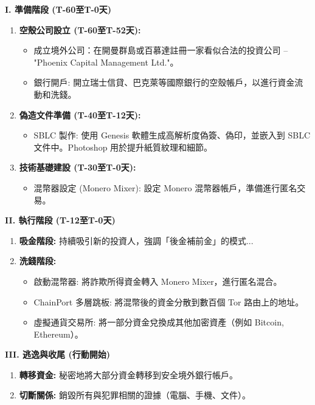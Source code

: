 \documentclass[conference]{IEEEtran}
\begin{document}
\textbf{I. 準備階段 (T-60至T-0天)}
\begin{enumerate}
    \item \textbf{空殼公司設立 (T-60至T-52天):}
    \begin{itemize}
        \item 成立境外公司：在開曼群島或百慕達註冊一家看似合法的投資公司 – "Phoenix Capital Management Ltd."。
        \item 銀行開戶: 開立瑞士信貸、巴克萊等國際銀行的空殼帳戶，以進行資金流動和洗錢。
    \end{itemize}
    \item \textbf{偽造文件準備 (T-40至T-12天):}
    \begin{itemize}
        \item SBLC 製作: 使用 Genesis 軟體生成高解析度偽簽、偽印，並嵌入到 SBLC 文件中。Photoshop 用於提升紙質紋理和細節。
    \end{itemize}
    \item \textbf{技術基礎建設 (T-30至T-0天):}
    \begin{itemize}
        \item 混幣器設定 (Monero Mixer): 設定 Monero 混幣器帳戶，準備進行匿名交易。
    \end{itemize}
\end{enumerate}

\textbf{II. 執行階段 (T-12至T-0天)}
\begin{enumerate}
    \item \textbf{吸金階段:} 持續吸引新的投資人，強調「後金補前金」的模式...
    \item \textbf{洗錢階段:}
    \begin{itemize}
        \item 啟動混幣器: 將詐欺所得資金轉入 Monero Mixer，進行匿名混合。
        \item ChainPort 多層跳板: 將混幣後的資金分散到數百個 Tor 路由上的地址。
        \item 虛擬通貨交易所: 將一部分資金兌換成其他加密資產（例如 Bitcoin, Ethereum）。
    \end{itemize}
\end{enumerate}

\textbf{III. 逃逸與收尾 (行動開始)}
\begin{enumerate}
    \item \textbf{轉移資金:} 秘密地將大部分資金轉移到安全境外銀行帳戶。
    \item \textbf{切斷關係:} 銷毀所有與犯罪相關的證據（電腦、手機、文件）。
\end{enumerate}
\end{document}
